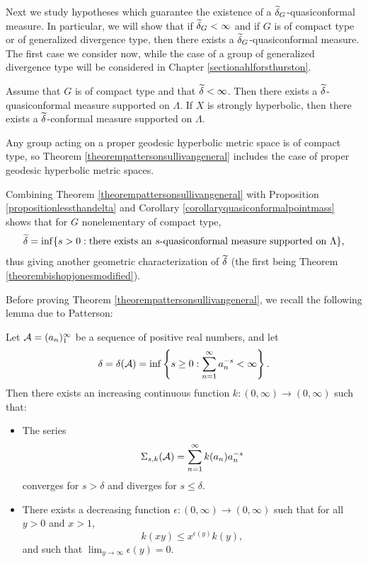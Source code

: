 Next we study hypotheses which guarantee the existence of a $\w\delta_G$-quasiconformal measure. In particular, we will show that if $\w\delta_G < \infty$ and if $G$ is of compact type or of generalized divergence type, then there exists a $\w\delta_G$-quasiconformal measure. The first case we consider now, while the case of a group of generalized divergence type will be considered in Chapter \ref{sectionahlforsthurston}.

\draftnewpage
\begin{theorem}
\label{theorempattersonsullivangeneral}
Assume that $G$ is of compact type and that $\w\delta < \infty$. Then there exists a $\w\delta$-quasiconformal measure supported on $\Lambda$. If $X$ is strongly hyperbolic, then there exists a $\w\delta$-conformal measure supported on $\Lambda$.
\end{theorem}
\begin{remark}
Any group acting on a proper geodesic hyperbolic metric space is of compact type, so Theorem \ref{theorempattersonsullivangeneral} includes the case of proper geodesic hyperbolic metric spaces.
\end{remark}

\begin{remark}
Combining Theorem \ref{theorempattersonsullivangeneral} with Proposition \ref{propositionlessthandelta} and Corollary \ref{corollaryquasiconformalpointmass} shows that for $G$ nonelementary of compact type,
\[
\w\delta = \inf\{s > 0 : \text{there exists an $s$-quasiconformal measure supported on $\Lambda$}\},
\]
thus giving another geometric characterization of $\w\delta$ (the first being Theorem \ref{theorembishopjonesmodified}).
\end{remark}

Before proving Theorem \ref{theorempattersonsullivangeneral}, we recall the following lemma due to Patterson:

\begin{lemma}
\label{lemmapatterson}
Let $\AA = (a_n)_1^\infty$ be a sequence of positive real numbers, and let
\[
\delta = \delta(\AA) = \inf\left\{s \geq 0 : \sum_{n = 1}^\infty a_n^{-s} < \infty\right\}.
\]
Then there exists an increasing continuous function $k:(0,\infty)\to(0,\infty)$ such that:
\begin{itemize}
\item[(i)] The series
\[
\Sigma_{s,k}(\AA) = \sum_{n = 1}^\infty k(a_n) a_n^{-s}
\]
converges for $s > \delta$ and diverges for $s\leq \delta$.
\item[(ii)] There exists a decreasing function $\epsilon:(0,\infty)\to(0,\infty)$ such that for all $y > 0$ and $x > 1$,
\begin{equation}
\label{patterson}
k(xy) \leq x^{\epsilon(y)} k(y),
\end{equation}
and such that $\lim_{y\to\infty}\epsilon(y) = 0$.
\end{itemize}
\end{lemma}



